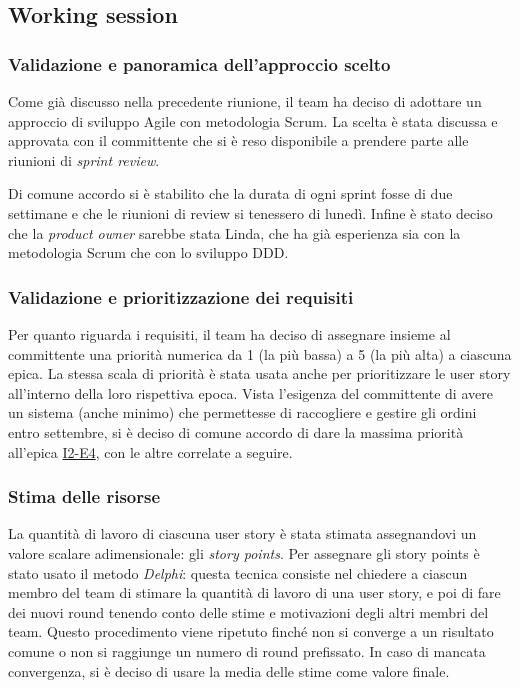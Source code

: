 \subsection{Working session}

\subsubsection{Validazione e panoramica dell'approccio scelto}
Come già discusso nella precedente riunione, il team ha deciso di adottare un approccio di sviluppo Agile con metodologia Scrum. La scelta è stata discussa e approvata con il committente che si è reso disponibile a prendere parte alle riunioni di \emph{sprint review}.

Di comune accordo si è stabilito che la durata di ogni sprint fosse di due settimane e che le riunioni di review si tenessero di lunedì. Infine è stato deciso che la \emph{product owner} sarebbe stata Linda, che ha già esperienza sia con la metodologia Scrum che con lo sviluppo DDD.

\subsubsection{Validazione e prioritizzazione dei requisiti}
Per quanto riguarda i requisiti, il team ha deciso di assegnare insieme al committente una priorità numerica da 1 (la più bassa) a 5 (la più alta) a ciascuna epica.
La stessa scala di priorità è stata usata anche per prioritizzare le user story all'interno della loro rispettiva epoca.
Vista l'esigenza del committente di avere un sistema (anche minimo) che permettesse di raccogliere e gestire gli ordini entro settembre, si è deciso di comune accordo di dare la massima priorità all'epica \hyperref[user-story:i2-e4]{I2-E4}, con le altre correlate a seguire.

\subsubsection{Stima delle risorse}
La quantità di lavoro di ciascuna user story è stata stimata assegnandovi un valore scalare adimensionale: gli \emph{story points}.
Per assegnare gli story points è stato usato il metodo \emph{Delphi}: questa tecnica consiste nel chiedere a ciascun membro del team di stimare la quantità di lavoro di una user story, e poi di fare dei nuovi round tenendo conto delle stime e motivazioni degli altri membri del team. Questo procedimento viene ripetuto finché non si converge a un risultato comune o non si raggiunge un numero di round prefissato.
In caso di mancata convergenza, si è deciso di usare la media delle stime come valore finale.

